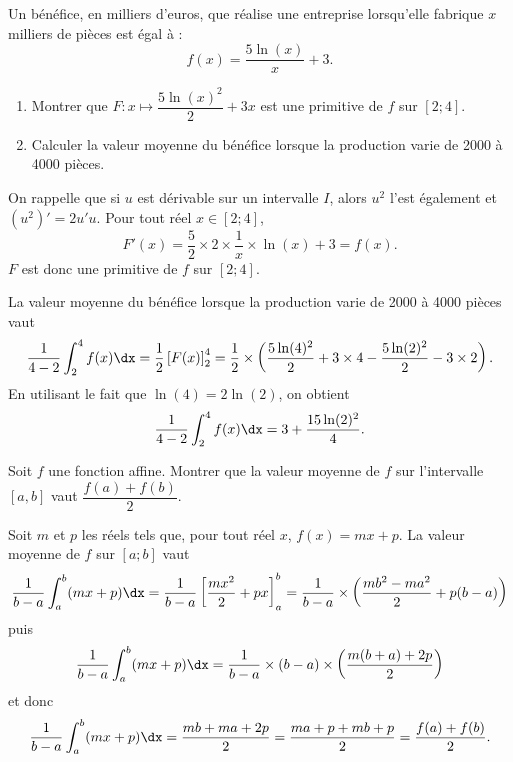 \documentclass[11pt,fleqn, openany]{book} %
\begin{document}
\begin{exercise}[topic=int02]Un bénéfice, en milliers d'euros, que réalise une entreprise lorsqu'elle fabrique $x$ milliers de pièces est égal à :
\[f(x)=\dfrac{5 \ln(x)}{x} +3.\]

\begin{enumerate}
\item Montrer que $F: x \mapsto \dfrac{5 \ln(x)^2}{2}+3x$ est une primitive de $f$ sur $[2;4]$.
\item Calculer la valeur moyenne du bénéfice lorsque la production varie de 2000 à 4000 pièces.
\end{enumerate}

\end{exercise}

\begin{solution}

 On rappelle que si \(u\) est dérivable sur un intervalle \(I\), alors \(u^2\) l'est également et \((u^2)'=2u'u\). Pour tout réel \(x\in[2;4]\), 
	\[F'(x)=\dfrac{5}{2} \times 2 \times \dfrac{1}{x} \times \ln (x) + 3 = f(x).\]
\(F\) est donc une primitive de \(f\) sur \([2;4]\).

La valeur moyenne du bénéfice lorsque la production varie de 2000 à 4000 pièces vaut
\[\dfrac{1}{4-2}\int_{2}^{4} f(x)\dx = \dfrac{1}{2}\left[F(x)\right]_{2}^4 = \dfrac{1}{2} \times \left(\dfrac{5 \ln(4)^2}{2}+3 \times 4 - \dfrac{5 \ln(2)^2}{2}-3\times 2\right).\]
	En utilisant le fait que \(\ln(4) = 2 \ln(2)\), on obtient
\[ \dfrac{1}{4-2}\int_{2}^{4} f(x)\dx = 3 + \dfrac{15\ln(2)^2}{4}.\]
\newpage
\end{solution}




\begin{exercise}[topic=int02]Soit $f$ une fonction affine. Montrer que la valeur moyenne de $f$ sur l'intervalle $[a,b]$ vaut $\dfrac{f(a)+f(b)}{2}$.\end{exercise}

\begin{solution}

Soit \(m\) et \(p\) les réels tels que, pour tout réel \(x\), \(f(x)=mx+p\). La valeur moyenne de \(f\) sur \([a;b]\) vaut
\[\dfrac{1}{b-a} \int_a^b (mx+p)\dx = \dfrac{1}{b-a} \left[\dfrac{mx^2}{2}+px\right]_a^b = \dfrac{1}{b-a} \times \left(\dfrac{mb^2-ma^2}{2}+p(b-a)\right)\]
puis
\[\dfrac{1}{b-a} \int_a^b (mx+p)\dx = \dfrac{1}{b-a} \times (b-a) \times \left(\dfrac{m(b+a)+2p}{2}\right)\]
et donc
\[\dfrac{1}{b-a} \int_a^b (mx+p)\dx =  \dfrac{mb+ma+2p}{2} = \dfrac{ma+p+mb+p}{2}=\dfrac{f(a)+f(b)}{2}.\]
\end{solution}
\end{document}
